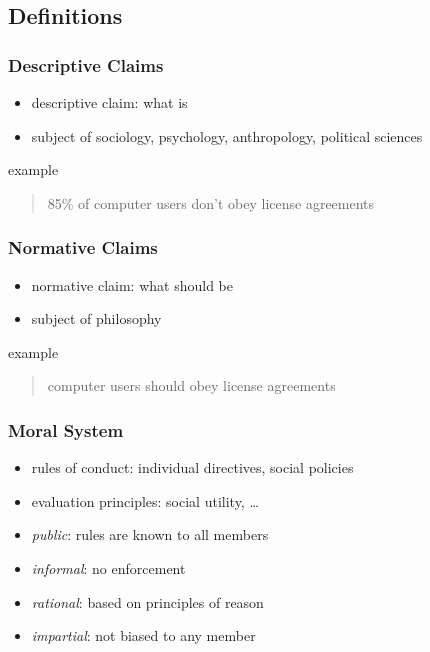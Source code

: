 \documentclass[dvipsnames]{beamer}
\theoremstyle{plain}
\begin{document}
\subsection{Definitions}

\begin{frame}
  \frametitle{Descriptive Claims}

  \begin{itemize}
    \item \alert{descriptive} claim: what is
    \item subject of sociology, psychology, anthropology, political sciences
  \end{itemize}

  \pause
  \begin{exampleblock}{example}
    \begin{quote}
      85\% of computer users don't obey license agreements
    \end{quote}
  \end{exampleblock}
\end{frame}

\begin{frame}
  \frametitle{Normative Claims}

  \begin{itemize}
    \item \alert{normative} claim: what should be
    \item subject of philosophy
  \end{itemize}

  \pause
  \begin{exampleblock}{example}
    \begin{quote}
      computer users should obey license agreements
    \end{quote}
  \end{exampleblock}
\end{frame}

\begin{frame}
  \frametitle{Moral System}

  \begin{itemize}
    \item rules of conduct: individual directives, social policies
    \item evaluation principles: social utility, \ldots

    \pause
    \bigskip
    \item \emph{public}: rules are known to all members
    \item \emph{informal}: no enforcement
    \item \emph{rational}: based on principles of reason
    \item \emph{impartial}: not biased to any member
  \end{itemize}
\end{frame}
\end{document}
